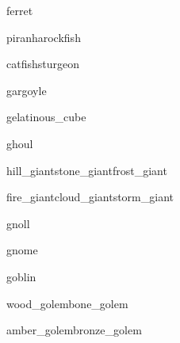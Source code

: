 \documentclass[a4paper,serif]{module}
\begin{document}
\begin{newmonster}{ferret}\end{newmonster}


\begin{newmonster2}{piranha}{rockfish}\end{newmonster2}
\begin{newmonster2*}{catfish}{sturgeon}{}{}\end{newmonster2*}

\begin{newmonster}{gargoyle}\end{newmonster}

\begin{newmonster}{gelatinous_cube}\end{newmonster}

\begin{newmonster}{ghoul}\end{newmonster}


\begin{newmonster3}{hill_giant}{stone_giant}{frost_giant}\end{newmonster3}
\begin{newmonster3*}{fire_giant}{cloud_giant}{storm_giant}{}{}\end{newmonster3*}

\begin{newmonster}{gnoll}\end{newmonster}

\begin{newmonster}{gnome}\end{newmonster}

\begin{newmonster}{goblin}\end{newmonster}


\begin{newmonster2}{wood_golem}{bone_golem}\end{newmonster2}
\begin{newmonster2*}{amber_golem}{bronze_golem}{}{}\end{newmonster2*}
\end{document}
